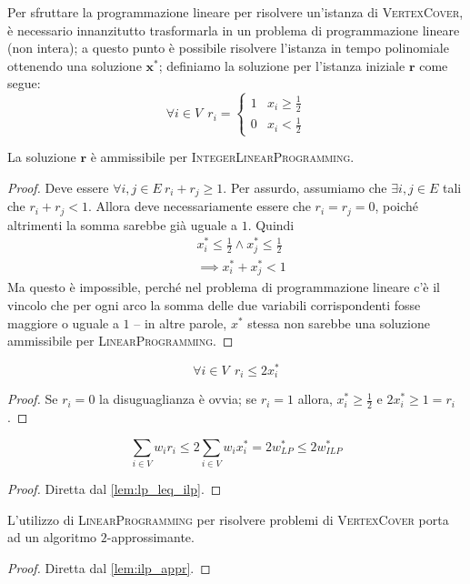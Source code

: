 Per sfruttare la programmazione lineare per risolvere un'istanza di
\textsc{VertexCover}, è necessario innanzitutto trasformarla in un problema
di programmazione lineare (non intera); a questo punto è possibile
risolvere l'istanza in tempo polinomiale ottenendo una soluzione $\mathbf{x}^*$;
definiamo la soluzione per l'istanza iniziale $\mathbf{r}$ come segue:
$$
	\forall i \in V ~~  r_i =
	\begin{cases}
		1 & x_i \geq \frac{1}{2} \\
		0 & x_i < \frac{1}{2}
	\end{cases}
$$
\begin{lemma}\label{lem:ilp_r_ammiss}
	La soluzione $\mathbf{r}$ è ammissibile per \textsc{IntegerLinearProgramming}.
\end{lemma}
\begin{proof}
	Deve essere $\forall i, j \in E ~ r_i+r_j \geq 1$.
	Per assurdo, assumiamo che $\exists i, j \in E$ tali che $r_i + r_j < 1$.
	Allora deve necessariamente essere che $r_i = r_j = 0$, poiché altrimenti
	la somma sarebbe già uguale a $1$. Quindi
	\begin{align*}
		 & x_i^* \leq \frac{1}{2} \land x_j^* \leq \frac{1}{2} \\
		 & \implies x_i^* +x_j^* < 1
	\end{align*}
	Ma questo è impossible, perché nel problema di programmazione lineare
	c'è il vincolo che per ogni arco la somma delle due variabili
	corrispondenti fosse maggiore o uguale a $1$ -- in altre parole,
	$x^*$ stessa non sarebbe una soluzione ammissibile per \textsc{LinearProgramming}.
\end{proof}
\begin{lemma} \label{lem:ilp_r_i_leq_2_x_i}
	$$ \forall i \in V ~~ r_i \leq 2x_i^*$$
\end{lemma}
\begin{proof}
	Se $r_i = 0$ la disuguaglianza è ovvia;
	se $r_i  = 1$ allora, $x^*_i \geq \frac{1}{2}$  e $2x_i^* \geq 1 = r_i$.
\end{proof}
\begin{lemma}\label{lem:ilp_appr}
	$$
		\sum_{i \in V} w_i r_i \leq 2 \sum_{i \in V} w_i x_i^* = 2w^*_{LP} \leq 2w^*_{ILP}
	$$
\end{lemma}
\begin{proof}
	Diretta dal \cref{lem:lp_leq_ilp}.
\end{proof}
\begin{theorem}
	L'utilizzo di \textsc{LinearProgramming} per risolvere problemi di \textsc{VertexCover}
	porta ad un algoritmo $2$-approssimante.
\end{theorem}
\begin{proof}
	Diretta dal \cref{lem:ilp_appr}.
\end{proof}


